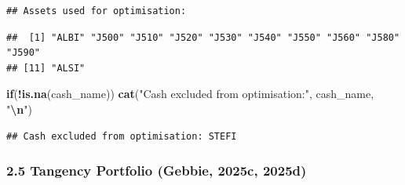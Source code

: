 \documentclass[
  12pt,
]{article}
\newenvironment{Shaded}{\begin{snugshade}}{\end{snugshade}}
\newcommand{\ControlFlowTok}[1]{\textcolor[rgb]{0.13,0.29,0.53}{\textbf{#1}}}
\newcommand{\FunctionTok}[1]{\textcolor[rgb]{0.13,0.29,0.53}{\textbf{#1}}}
\newcommand{\NormalTok}[1]{#1}
\newcommand{\SpecialCharTok}[1]{\textcolor[rgb]{0.81,0.36,0.00}{\textbf{#1}}}
\newcommand{\StringTok}[1]{\textcolor[rgb]{0.31,0.60,0.02}{#1}}
\begin{document}
\begin{verbatim}
## Assets used for optimisation:
\end{verbatim}

\begin{verbatim}
##  [1] "ALBI" "J500" "J510" "J520" "J530" "J540" "J550" "J560" "J580" "J590"
## [11] "ALSI"
\end{verbatim}

\begin{Shaded}
\begin{Highlighting}[]
\ControlFlowTok{if}\NormalTok{(}\SpecialCharTok{!}\FunctionTok{is.na}\NormalTok{(cash\_name)) }\FunctionTok{cat}\NormalTok{(}\StringTok{"Cash excluded from optimisation:"}\NormalTok{, cash\_name, }\StringTok{"}\SpecialCharTok{\textbackslash{}n}\StringTok{"}\NormalTok{)}
\end{Highlighting}
\end{Shaded}

\begin{verbatim}
## Cash excluded from optimisation: STEFI
\end{verbatim}

\subsubsection{2.5 Tangency Portfolio (Gebbie, 2025c,
2025d)}\label{tangency-portfolio-tim_btmlx-tim_prep}
\end{document}
